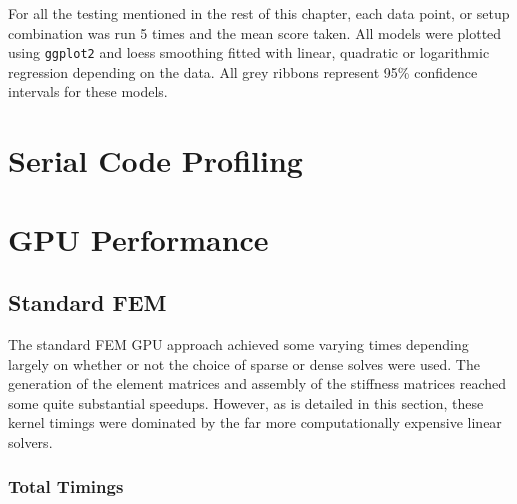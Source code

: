 \begin{remark}
For all the testing mentioned in the rest of this chapter, each data point, or setup combination was run 5 times and the mean score taken. All models were plotted using \texttt{ggplot2} and loess smoothing fitted with linear, quadratic or logarithmic regression depending on the data. All grey ribbons represent 95\% confidence intervals for these models.
\end{remark}

\section{Serial Code Profiling}

\section{GPU Performance}

\subsection{Standard FEM}

The standard FEM GPU approach achieved some varying times depending largely on whether or not the choice of sparse or dense solves were used. The generation of the element matrices and assembly of the stiffness matrices reached some quite substantial speedups. However, as is detailed in this section, these kernel timings were dominated by the far more computationally expensive linear solvers.

\subsubsection{Total Timings}

